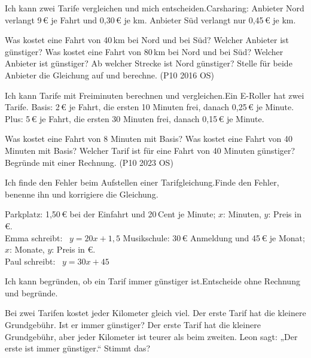 \begin{aufgabe}{Ich kann zwei Tarife vergleichen und mich entscheiden.\newline Carsharing: Anbieter Nord verlangt 9\,€ je Fahrt und 0,30\,€ je km. Anbieter Süd verlangt nur 0,45\,€ je km.}
\begin{teile}
\teil Was kostet eine Fahrt von 40\,km bei Nord und bei Süd? Welcher Anbieter ist günstiger?
\teil Was kostet eine Fahrt von 80\,km bei Nord und bei Süd? Welcher Anbieter ist günstiger?
\teil Ab welcher Strecke ist Nord günstiger? Stelle für beide Anbieter die Gleichung auf und berechne. (P10 2016 OS)
\end{teile}
\end{aufgabe}

\begin{aufgabe}{Ich kann Tarife mit Freiminuten berechnen und vergleichen.\newline Ein E-Roller hat zwei Tarife. Basis: 2\,€ je Fahrt, die ersten 10 Minuten frei, danach 0,25\,€ je Minute. Plus: 5\,€ je Fahrt, die ersten 30 Minuten frei, danach 0,15\,€ je Minute.}
\begin{teile}
\teil Was kostet eine Fahrt von 8 Minuten mit Basis? \quad \leerfeld[€]
\teil Was kostet eine Fahrt von 40 Minuten mit Basis? \quad \leerfeld[€]
\teil Welcher Tarif ist für eine Fahrt von 40 Minuten günstiger? Begründe mit einer Rechnung. (P10 2023 OS)
\end{teile}
\end{aufgabe}


\begin{aufgabe}{Ich finde den Fehler beim Aufstellen einer Tarifgleichung.\newline Finde den Fehler, benenne ihn und korrigiere die Gleichung.}
\begin{teile}
\teil Parkplatz: 1,50\,€ bei der Einfahrt und 20\,Cent je Minute; $x$: Minuten, $y$: Preis in €. \\ Emma schreibt: \ $y = 20x + 1{,}5$
\teil Musikschule: 30\,€ Anmeldung und 45\,€ je Monat; $x$: Monate, $y$: Preis in €. \\ Paul schreibt: \ $y = 30x + 45$
\end{teile}
\end{aufgabe}

\begin{aufgabe}{Ich kann begründen, ob ein Tarif immer günstiger ist.\newline Entscheide ohne Rechnung und begründe.}
\begin{teile}
\teil Bei zwei Tarifen kostet jeder Kilometer gleich viel. Der erste Tarif hat die kleinere Grundgebühr. Ist er immer günstiger?
\teil Der erste Tarif hat die kleinere Grundgebühr, aber jeder Kilometer ist teurer als beim zweiten. Leon sagt: „Der erste ist immer günstiger.“ Stimmt das?
\end{teile}
\end{aufgabe}
